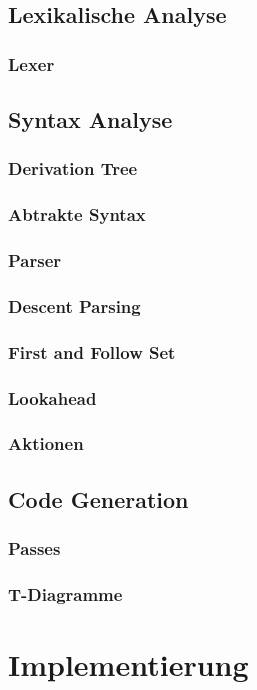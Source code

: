 \documentclass{scrreprt}
\begin{document}
  \section{Lexikalische Analyse}
  \subsection{Lexer}
  \section{Syntax Analyse}
  \subsection{Derivation Tree}
  \subsection{Abtrakte Syntax}
  \subsection{Parser}
  \subsection{Descent Parsing}
  \subsection{First and Follow Set}
  \subsection{Lookahead}
  \subsection{Aktionen}
  \section{Code Generation}
  \subsection{Passes}
  \subsection{T-Diagramme}
  \chapter{Implementierung}
\end{document}
